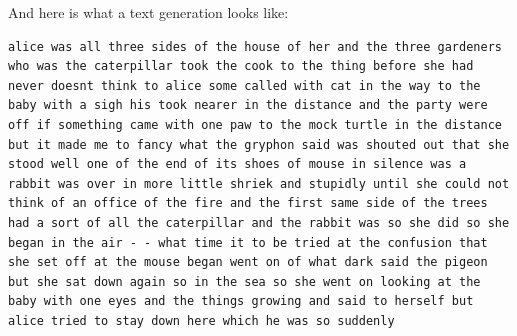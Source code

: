 \documentclass{article}
\begin{document}
And here is what a text generation looks like:
\begin{lstlisting}[breaklines]
    alice was all three sides of the house of her and the three gardeners who was the caterpillar took the cook to the thing before she had never doesnt think to alice some called with cat in the way to the baby with a sigh his took nearer in the distance and the party were off if something came with one paw to the mock turtle in the distance but it made me to fancy what the gryphon said was shouted out that she stood well one of the end of its shoes of mouse in silence was a rabbit was over in more little shriek and stupidly until she could not think of an office of the fire and the first same side of the trees had a sort of all the caterpillar and the rabbit was so she did so she began in the air - - what time it to be tried at the confusion that she set off at the mouse began went on of what dark said the pigeon but she sat down again so in the sea so she went on looking at the baby with one eyes and the things growing and said to herself but alice tried to stay down here which he was so suddenly 

\end{lstlisting}
\end{document}
